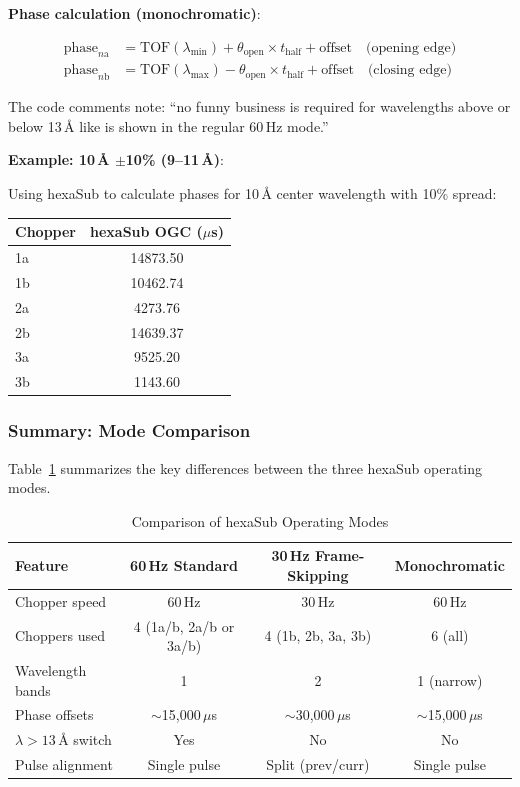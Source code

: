 \documentclass[11pt,letterpaper]{article}
\begin{document}
\textbf{Phase calculation (monochromatic)}:

\begin{align}
\text{phase}_{n\text{a}} &= \text{TOF}(\lambda_{\min}) + \theta_{\text{open}} \times t_{\text{half}} + \text{offset} \quad \text{(opening edge)} \\
\text{phase}_{n\text{b}} &= \text{TOF}(\lambda_{\max}) - \theta_{\text{open}} \times t_{\text{half}} + \text{offset} \quad \text{(closing edge)}
\end{align}

The code comments note: ``no funny business is required for wavelengths above or below 13\,\AA{} 
like is shown in the regular 60\,Hz mode.''

\textbf{Example: 10\,\AA{} $\pm$10\% (9--11\,\AA{})}:

Using hexaSub to calculate phases for 10\,\AA{} center wavelength with 10\% spread:

\begin{table}[h]
\centering
\begin{tabular}{lc}
\toprule
Chopper & hexaSub OGC ($\mu$s) \\
\midrule
1a & 14873.50 \\
1b & 10462.74 \\
2a & 4273.76 \\
2b & 14639.37 \\
3a & 9525.20 \\
3b & 1143.60 \\
\bottomrule
\end{tabular}
\end{table}

\subsubsection{Summary: Mode Comparison}

Table~\ref{tab:mode_comparison} summarizes the key differences between the three hexaSub operating modes.

\begin{table}[h]
\centering
\caption{Comparison of hexaSub Operating Modes}
\label{tab:mode_comparison}
\begin{tabular}{lccc}
\toprule
Feature & 60\,Hz Standard & 30\,Hz Frame-Skipping & Monochromatic \\
\midrule
Chopper speed & 60\,Hz & 30\,Hz & 60\,Hz \\
Choppers used & 4 (1a/b, 2a/b or 3a/b) & 4 (1b, 2b, 3a, 3b) & 6 (all) \\
Wavelength bands & 1 & 2 & 1 (narrow) \\
Phase offsets & $\sim$15,000\,$\mu$s & $\sim$30,000\,$\mu$s & $\sim$15,000\,$\mu$s \\
$\lambda > 13$\,\AA{} switch & Yes & No & No \\
Pulse alignment & Single pulse & Split (prev/curr) & Single pulse \\
\bottomrule
\end{tabular}
\end{table}
\end{document}
